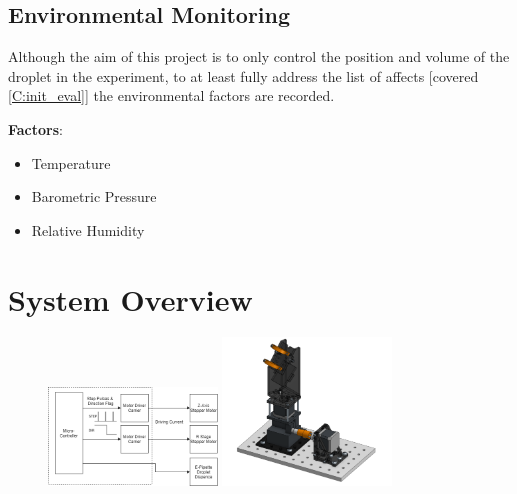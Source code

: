 \subsection{Environmental Monitoring}

Although the aim of this project is to only control the position and volume of the droplet in the experiment, to at least fully address the list of affects [covered \ref{C:init_eval}] the environmental factors are recorded.

\textbf{Factors}:
\begin{itemize}
    \item Temperature
    \item Barometric Pressure
    \item Relative Humidity
\end{itemize}


\section{System Overview}

\begin{figure}[h]
    \centering
    \includegraphics[width=0.4\textwidth]{img/ED_block_diag.png}
    \includegraphics[width=0.4\textwidth]{img/full_mech.png}
\end{figure}